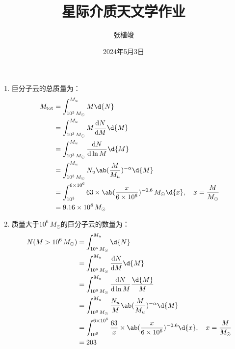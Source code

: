 \documentclass[a4paper,fontset=none]{ctexart}
\title{\textbf{星际介质天文学作业}}
\author{张植竣}
\date{2024年5月3日}
\begin{document}
\maketitle

\begin{enumerate}
    \item[32.1 (a)]
    巨分子云的总质量为：
    \begin{align*}
        M_{\mathrm{tot}}
        &= \int_{10^3\,M_\odot}^{M_u} M\d{N} \\
        &= \int_{10^3\,M_\odot}^{M_u} M\odv{N}{M} \d{M} \\
        &= \int_{10^3\,M_\odot}^{M_u} \odv{N}{\ln{M}} \d{M} \\
        &= \int_{10^3\,M_\odot}^{M_u} N_u \ab(\frac{M}{M_u})^{-\alpha} \d{M} \\
        &= \int_{10^3}^{6 \times 10^6} 63 \times \ab(\frac{x}{6 \times 10^6})^{-0.6}\,M_\odot \d{x},\quad x = \frac{M}{M_\odot} \\
        &= 9.16 \times 10^8\,M_\odot
    \end{align*}

    \medskip
    \item[32.1 (b)]
    质量大于$10^6\,M_\odot$的巨分子云的数量为：
    \begin{align*}
        N(M > 10^6\,M_\odot)
        &= \int_{10^6\,M_\odot}^{M_u} \d{N} \\
        &= \int_{10^6\,M_\odot}^{M_u} \odv{N}{M} \d{M} \\
        &= \int_{10^6\,M_\odot}^{M_u} \odv{N}{\ln{M}} \frac{\d{M}}{M} \\
        &= \int_{10^6\,M_\odot}^{M_u} \frac{N_u}{M} \ab(\frac{M}{M_u})^{-\alpha} \d{M} \\
        &= \int_{10^6}^{6 \times 10^6} \frac{63}{x} \times \ab(\frac{x}{6 \times 10^6})^{-0.6} \d{x},\quad x = \frac{M}{M_\odot} \\
        &= 203
    \end{align*}

\end{enumerate}
\end{document}
